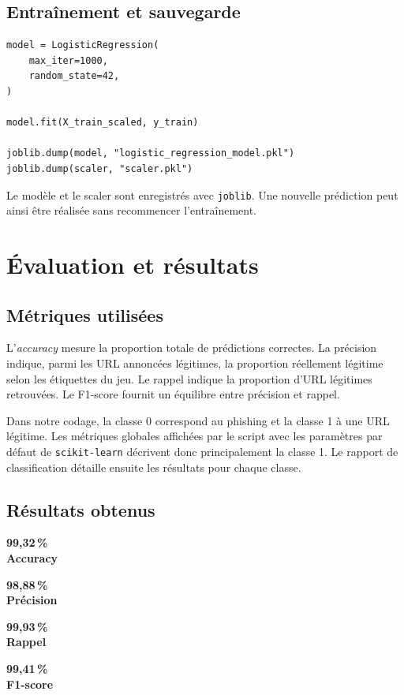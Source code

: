 \documentclass[11pt,a4paper]{report}
\newcommand{\metric}[2]{%
  \begin{minipage}[t]{0.22\textwidth}
    \centering
    \colorbox{cmrpilight}{\parbox[c][1.6cm][c]{0.92\linewidth}{%
      \centering\Large\bfseries\color{cmrpiblue}#1\\[-1mm]
      \normalsize\color{black}#2}}
  \end{minipage}
}
\begin{document}
\section{Entraînement et sauvegarde}

\begin{lstlisting}[caption={Entraînement de la régression logistique}]
model = LogisticRegression(
    max_iter=1000,
    random_state=42,
)

model.fit(X_train_scaled, y_train)

joblib.dump(model, "logistic_regression_model.pkl")
joblib.dump(scaler, "scaler.pkl")
\end{lstlisting}

Le modèle et le scaler sont enregistrés avec \texttt{joblib}. Une nouvelle
prédiction peut ainsi être réalisée sans recommencer l'entraînement.

\chapter{Évaluation et résultats}

\section{Métriques utilisées}

L'\emph{accuracy} mesure la proportion totale de prédictions correctes. La
précision indique, parmi les URL annoncées légitimes, la proportion réellement
légitime selon les étiquettes du jeu. Le rappel indique la proportion d'URL
légitimes retrouvées. Le F1-score fournit un équilibre entre précision et
rappel.

Dans notre codage, la classe 0 correspond au phishing et la classe 1 à une URL
légitime. Les métriques globales affichées par le script avec les paramètres
par défaut de \texttt{scikit-learn} décrivent donc principalement la classe 1.
Le rapport de classification détaille ensuite les résultats pour chaque classe.

\section{Résultats obtenus}

\begin{center}
\metric{99,32\,\%}{Accuracy}\hfill
\metric{98,88\,\%}{Précision}\hfill
\metric{99,93\,\%}{Rappel}\hfill
\metric{99,41\,\%}{F1-score}
\end{center}

\vspace{0.6cm}
\end{document}
